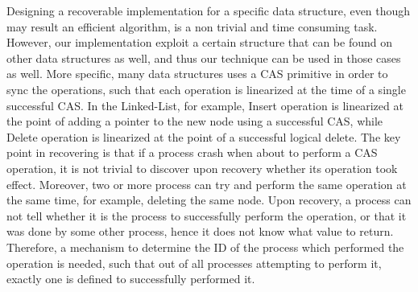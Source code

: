 Designing a recoverable implementation for a specific data structure, even though may result an efficient algorithm, is a non trivial and time consuming task. However, our implementation exploit a certain structure that can be found on other data structures as well, and thus our technique can be used in those cases as well. More specific, many data structures uses a CAS primitive in order to sync the operations, such that each operation is linearized at the time of a single successful CAS. In the Linked-List, for example, Insert operation is linearized at the point of adding a pointer to the new node using a successful CAS, while Delete operation is linearized at the point of a successful logical delete. The key point in recovering is that if a process crash when about to perform a CAS operation, it is not trivial to discover upon recovery whether its operation took effect. Moreover, two or more process can try and perform the same operation at the same time, for example, deleting the same node. Upon recovery, a process can not tell whether it is the process to successfully perform the operation, or that it was done by some other process, hence it does not know what value to return. Therefore, a mechanism to determine the ID of the process which performed the operation is needed, such that out of all processes attempting to perform it, exactly one is defined to successfully performed it.
